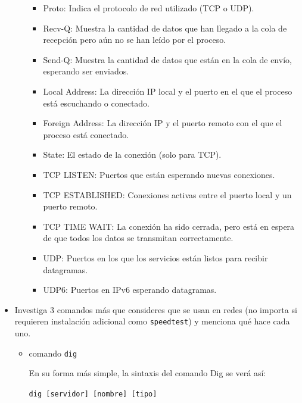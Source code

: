 \begin{itemize}
\begin{itemize}
        \begin{itemize}
            \item Proto: Indica el protocolo de red utilizado (TCP o UDP).
            \item Recv-Q: Muestra la cantidad de datos que han llegado a la cola de recepción pero aún no se han leído por el proceso.
            \item Send-Q: Muestra la cantidad de datos que están en la cola de envío, esperando ser enviados.
            \item Local Address: La dirección IP local y el puerto en el que el proceso está escuchando o conectado.
            \item Foreign Address: La dirección IP y el puerto remoto con el que el proceso está conectado.
            \item State: El estado de la conexión (solo para TCP).
        \end{itemize}

        \begin{itemize}
            \item TCP LISTEN: Puertos que están esperando nuevas conexiones.
            \item TCP ESTABLISHED: Conexiones activas entre el puerto local y un puerto remoto.
            \item TCP TIME WAIT: La conexión ha sido cerrada, pero está en espera de que todos los datos se transmitan correctamente.
            \item UDP: Puertos en los que los servicios están listos para recibir datagramas.
            \item UDP6: Puertos en IPv6 esperando datagramas.
        \end{itemize}

    \end{itemize}

    \item Investiga 3 comandos más que consideres que se usan en redes (no importa si requieren instalación adicional como \texttt{speedtest}) y menciona qué hace cada uno.
    
    \begin{itemize}
        \item comando \texttt{dig} \cite*{ComandDIG}
        
        En su forma más simple, la sintaxis del comando Dig se verá así:
        \begin{center}
            \texttt{dig [servidor] [nombre] [tipo]}
        \end{center}
        

\end{itemize}
\end{itemize}
